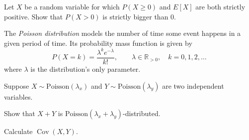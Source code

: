 \documentclass[a4paper,10pt,landscape,twocolumn]{scrartcl}
\DeclareMathOperator{\Cov}{Cov}
\begin{document}
\begin{exercise}[]
Let $X$ be a random variable for which $P(X\ge 0)$ and $E[X]$ are both strictly positive. Show that $P(X>0)$ is strictly bigger than $0$.
\end{exercise}

\begin{exercise}
The \emph{Poisson distribution} 	models the number of time some event happens in a given period of time. Its probability mass function is given by
\[
P(X = k) = {\frac {\lambda ^{k}e^{-\lambda }}{k!}}, \qquad \lambda \in \mathbb{R}_{>0}, \quad k=0,1,2,\dots
\]
where $\lambda$ is the distribution's only parameter.

Suppose $X \sim \text{Poisson}(\lambda_x)$ and $Y \sim \text{Poisson}(\lambda_y)$ are two independent variables. 

	\begin{subex}
	Show that $X+Y$ is $\text{Poisson}(\lambda_x + \lambda_y)$-distributed.
	\end{subex}
	
	\begin{subex}
	Calculate $\Cov(X, Y)$.
	\end{subex}
	


\end{exercise}
\end{document}
